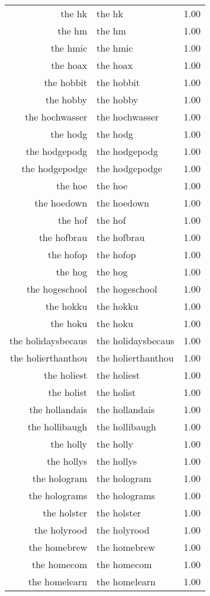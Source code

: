 \begin{table}[ht]
\begin{tabular}{rlr}
  the hk & the hk & 1.00 \\ 
  the hm & the hm & 1.00 \\ 
  the hmic & the hmic & 1.00 \\ 
  the hoax & the hoax & 1.00 \\ 
  the hobbit & the hobbit & 1.00 \\ 
  the hobby & the hobby & 1.00 \\ 
  the hochwasser & the hochwasser & 1.00 \\ 
  the hodg & the hodg & 1.00 \\ 
  the hodgepodg & the hodgepodg & 1.00 \\ 
  the hodgepodge & the hodgepodge & 1.00 \\ 
  the hoe & the hoe & 1.00 \\ 
  the hoedown & the hoedown & 1.00 \\ 
  the hof & the hof & 1.00 \\ 
  the hofbrau & the hofbrau & 1.00 \\ 
  the hofop & the hofop & 1.00 \\ 
  the hog & the hog & 1.00 \\ 
  the hogeschool & the hogeschool & 1.00 \\ 
  the hokku & the hokku & 1.00 \\ 
  the hoku & the hoku & 1.00 \\ 
  the holidaysbecaus & the holidaysbecaus & 1.00 \\ 
  the holierthanthou & the holierthanthou & 1.00 \\ 
  the holiest & the holiest & 1.00 \\ 
  the holist & the holist & 1.00 \\ 
  the hollandais & the hollandais & 1.00 \\ 
  the hollibaugh & the hollibaugh & 1.00 \\ 
  the holly & the holly & 1.00 \\ 
  the hollys & the hollys & 1.00 \\ 
  the hologram & the hologram & 1.00 \\ 
  the holograms & the holograms & 1.00 \\ 
  the holster & the holster & 1.00 \\ 
  the holyrood & the holyrood & 1.00 \\ 
  the homebrew & the homebrew & 1.00 \\ 
  the homecom & the homecom & 1.00 \\ 
  the homelearn & the homelearn & 1.00 \\ 

\end{tabular}
\end{table}

